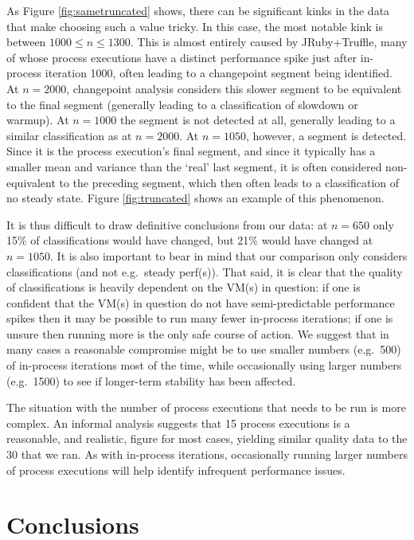 \documentclass[acmsmall]{acmart}\settopmatter{printfolios=true}
\begin{document}
As Figure \ref{fig:sametruncated} shows, there can be significant
kinks in the data that make choosing such a value tricky. In this case, the most
notable kink is between $1000 \leq n \leq 1300$. This is almost entirely caused by
JRuby+Truffle, many of whose process executions have a distinct performance spike
just after in-process iteration 1000, often leading to a changepoint
segment being identified. At $n=2000$, changepoint analysis considers this slower
segment to be equivalent to the final segment (generally leading to a classification
of slowdown or warmup). At $n=1000$ the segment is not detected at all, generally
leading to a similar classification as at $n=2000$. At $n=1050$, however, a
segment is detected. Since it is the process execution's final segment,
and since it typically has a smaller mean and variance than the `real' last
segment, it is often considered non-equivalent to the preceding segment,
which then often leads to a classification of no steady state.
Figure \ref{fig:truncated} shows an example of this phenomenon.

It is thus difficult to draw definitive conclusions from our data:
at $n=650$ only 15\% of classifications would have changed,
but 21\% would have changed at $n=1050$. It is also important to bear in mind
that our comparison only considers classifications (and not e.g.~steady perf(s)).
That said, it is clear that the quality of classifications
is heavily dependent on the VM(s) in question: if one is confident that the VM(s) in question do not have
semi-predictable performance spikes then it may be possible to run many fewer
in-process iterations; if one is unsure then running more is the only safe
course of action. We suggest that in many cases a reasonable compromise might be to
use smaller numbers (e.g.~500) of in-process iterations most
of the time, while occasionally using larger numbers (e.g.~1500) to see if
longer-term stability has been affected.

The situation with the number of process executions that needs to be run
is more complex. An informal analysis suggests that
15 process executions is a reasonable, and realistic, figure for most
cases, yielding similar quality data to the 30 that we ran. As with in-process
iterations, occasionally running larger numbers of process executions will help
identify infrequent performance issues.


\section{Conclusions}
\label{sec:conclusions}
\end{document}
